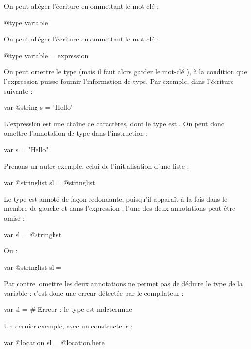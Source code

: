On peut alléger l'écriture en ommettant le mot clé  :
\begin{galgascode}
@type variable
\end{galgascode}




On peut alléger l'écriture en ommettant le mot clé  :
\begin{galgascode}
@type variable = expression
\end{galgascode}

On peut omettre le type (mais il faut alors garder le mot-clé ), à la condition que l'expression puisse fournir l'information de type. Par exemple, dans l'écriture suivante :
\begin{galgascode}
var @string s = "Hello"
\end{galgascode}

L'expression est une chaîne de caractères, dont le type est . On peut donc omettre l'annotation de type dans l'instruction :
\begin{galgascode}
var s = "Hello"
\end{galgascode}


Prenons un autre exemple, celui de l'initialisation d'une liste :
\begin{galgascode}
var @stringlist sl = @stringlist {}
\end{galgascode}

Le type est annoté de façon redondante, puisqu'il apparaît à la fois dans le membre de gauche et dans l'expression ; l'une des deux annotations peut être omise :
\begin{galgascode}
var sl = @stringlist {}
\end{galgascode}

Ou :
\begin{galgascode}
var @stringlist sl = {}
\end{galgascode}

Par contre, omettre les deux annotations ne permet pas de déduire le type de la variable : c'est donc une erreur détectée par le compilateur :
\begin{galgascode}
var sl = {} # Erreur : le type est indetermine
\end{galgascode}

Un dernier exemple, avec un constructeur :
\begin{galgascode}
var @location sl = @location.here
\end{galgascode}

